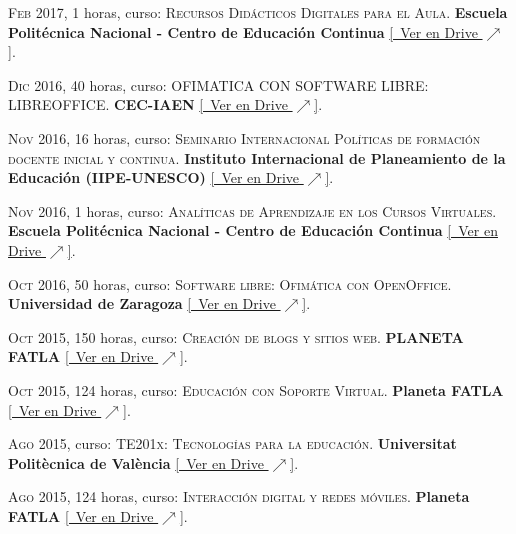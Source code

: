 \documentclass[a4paper]{article}
\begin{document}
\textsc{Feb} 2017, 1 horas, curso: \textsc{Recursos Didácticos Digitales para el Aula}.
\textbf{Escuela Politécnica Nacional - Centro de Educación Continua} \small \href{https://drive.google.com/file/d/1FilZ__y5sJweRGMCGZe0PvF2zX-L1AZ8/view}{[\faGoogleDrive~Ver en Drive $\nearrow$]}.

\textsc{Dic} 2016, 40 horas, curso: \textsc{OFIMATICA CON SOFTWARE LIBRE: LIBREOFFICE}.
\textbf{CEC-IAEN} \small \href{https://drive.google.com/file/d/1Ldvn70QNFTFIItB_4OzV9o8LsOugmLJq/view}{[\faGoogleDrive~Ver en Drive $\nearrow$]}.

\textsc{Nov} 2016, 16 horas, curso: \textsc{Seminario Internacional Políticas de formación docente inicial y continua}.
\textbf{Instituto Internacional de Planeamiento de la Educación (IIPE-UNESCO)} \small \href{https://drive.google.com/file/d/1AIaAckL-0pyfv7YopY0BAs5RkOxPEHl0/view}{[\faGoogleDrive~Ver en Drive $\nearrow$]}.

\textsc{Nov} 2016, 1 horas, curso: \textsc{Analíticas de Aprendizaje en los Cursos Virtuales}.
\textbf{Escuela Politécnica Nacional - Centro de Educación Continua} \small \href{https://drive.google.com/file/d/12px2lMkoFaNlFFvozRlG_xQSIfomS0iC/view}{[\faGoogleDrive~Ver en Drive $\nearrow$]}.

\textsc{Oct} 2016, 50 horas, curso: \textsc{Software libre: Ofimática con OpenOffice}.
\textbf{Universidad de Zaragoza} \small \href{https://drive.google.com/file/d/10KSbug4uMcYBHxQOTBA2kiTDEhrMF14i/view}{[\faGoogleDrive~Ver en Drive $\nearrow$]}.

\textsc{Oct} 2015, 150 horas, curso: \textsc{Creación de blogs y sitios web}.
\textbf{PLANETA FATLA} \small \href{https://drive.google.com/file/d/1Xk3bVuSn76XHKScggGixEovi2gDeKuIO/view}{[\faGoogleDrive~Ver en Drive $\nearrow$]}.

\textsc{Oct} 2015, 124 horas, curso: \textsc{Educación con Soporte Virtual}.
\textbf{Planeta FATLA} \small \href{https://drive.google.com/file/d/1fYORqNQFRdkG9SYopYUWPHZieNUGrG4s/view}{[\faGoogleDrive~Ver en Drive $\nearrow$]}.

\textsc{Ago} 2015, curso: \textsc{TE201x: Tecnologías para la educación}.
\textbf{Universitat Politècnica de València} \small \href{https://drive.google.com/file/d/1vJ3CyBBWwG9s-A9X8GelvcA-chvWHpOi/view}{[\faGoogleDrive~Ver en Drive $\nearrow$]}.

\textsc{Ago} 2015, 124 horas, curso: \textsc{Interacción digital y redes móviles}.
\textbf{Planeta FATLA} \small \href{https://drive.google.com/file/d/1plbtThR8W_ZX9msi8T4XF7usPxeyozs6/view}{[\faGoogleDrive~Ver en Drive $\nearrow$]}.
\end{document}

